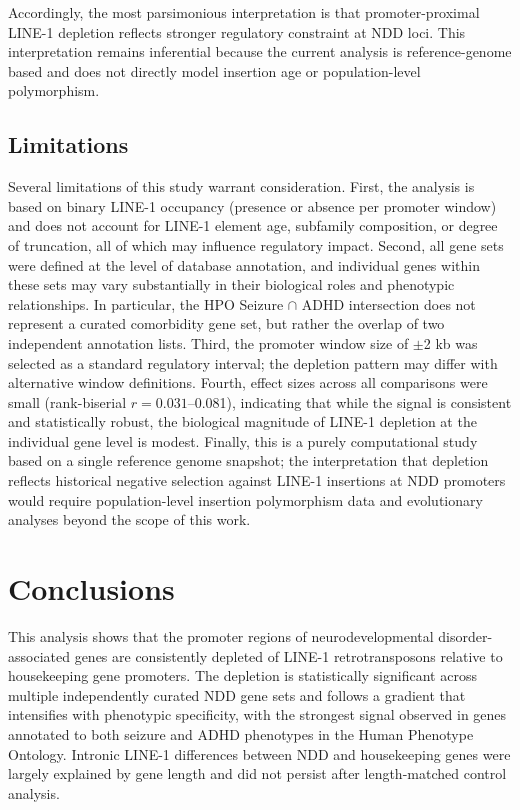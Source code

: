 \documentclass[preprints,briefreport,submit,pdftex,oneauthor]{Definitions/mdpi}
\begin{document}
Accordingly, the most parsimonious interpretation is that promoter-proximal LINE-1 depletion reflects stronger regulatory constraint at NDD loci. This interpretation remains inferential because the current analysis is reference-genome based and does not directly model insertion age or population-level polymorphism.

\subsection{Limitations}

Several limitations of this study warrant consideration.
First, the analysis is based on binary LINE-1 occupancy
(presence or absence per promoter window) and does not account
for LINE-1 element age, subfamily composition, or degree of
truncation, all of which may influence regulatory impact.
Second, all gene sets were defined at the level of database
annotation, and individual genes within these sets may vary
substantially in their biological roles and phenotypic
relationships. In particular, the HPO Seizure $\cap$ ADHD
intersection does not represent a curated comorbidity gene
set, but rather the overlap of two independent annotation
lists. Third, the promoter window size of $\pm$2 kb was
selected as a standard regulatory interval; the depletion
pattern may differ with alternative window definitions.
Fourth, effect sizes across all comparisons were small
(rank-biserial $r = 0.031$--0.081), indicating that while
the signal is consistent and statistically robust, the
biological magnitude of LINE-1 depletion at the individual
gene level is modest. Finally, this is a purely computational
study based on a single reference genome snapshot; the
interpretation that depletion reflects historical negative
selection against LINE-1 insertions at NDD promoters would
require population-level insertion polymorphism data and
evolutionary analyses beyond the scope of this work.

\section{Conclusions}

This analysis shows that the promoter regions of
neurodevelopmental disorder-associated genes are consistently
depleted of LINE-1 retrotransposons relative to housekeeping
gene promoters. The depletion is statistically significant
across multiple independently curated NDD gene sets and
follows a gradient that intensifies with phenotypic specificity,
with the strongest signal observed in genes annotated to both
seizure and ADHD phenotypes in the Human Phenotype Ontology.
Intronic LINE-1 differences between NDD and housekeeping genes
were largely explained by gene length and did not persist after
length-matched control analysis.
\end{document}
